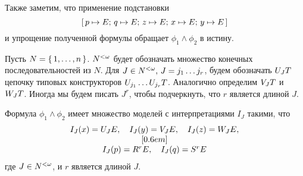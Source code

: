 Также заметим, что применение подстановки
\[
    \textrm{[} \, p \mapsto {E}; \, q \mapsto {E}; \,
    z \mapsto {E}; \, x \mapsto {E}; \,
    y \mapsto {E} \, \textrm{]}
\]
и упрощение полученной формулы обращает $\phi_{1} \land \phi_{2}$ в истину.

Пусть  $N=\lbrace \, 1,\ldots,n \, \rbrace$. $N^{<\omega}$ будет обозначать множество конечных последовательностей из $N$. Для $J \in N^{<\omega}, \, J = j_1 \ldots j_r$, будем обозначать ${U}_{J}T$ цепочку типовых конструкторов ${U}_{j_{1}} \ldots {U}_{j_{r}}T$. Аналогично определим ${V}_{J}T$ и ${W}_{J}T$. Иногда мы будем писать $J^r$, чтобы подчеркнуть, что $r$ является длиной $J$.
\begin{thm}{\label{thm:pcpindices}}
Формула $\phi_{1} \land \phi_{2}$ имеет множество моделей с интерпретациями $I_{J}$ такими, что
\[
    \begin{array}{c}
        I_{J}(x) = {U}_{J}{E}, \quad I_{J}(y) = {V}_{J}{E}, \quad I_{J}(z) = {W}_{J}{E}, \\
        [0.6em] \\
        I_{J}(p) = {R}^{r}{E}, \quad I_{J}(q) = {S}^{r}{E}
        
    \end{array}
\]
где $J \in N^{<\omega}$, и $r$ является длиной $J$.
\end{thm}
